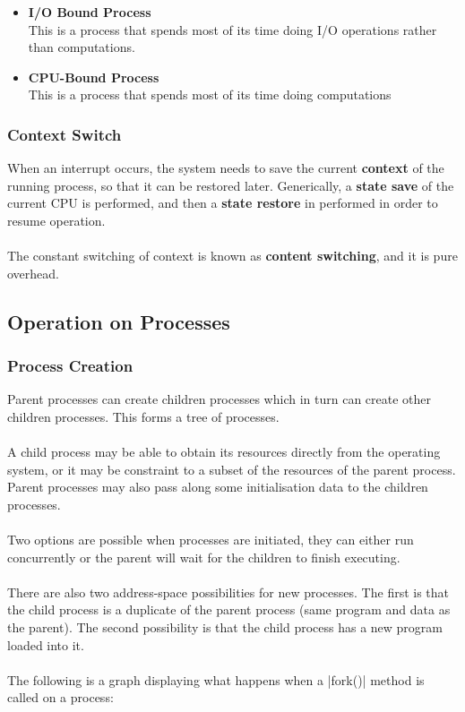 \documentclass{article}
\begin{document}
\begin{itemize}
	\item \textbf{I/O Bound Process}
	\vspace{.2cm} \\
	This is a process that spends most of its time doing I/O operations rather than computations.
	
	\item \textbf{CPU-Bound Process}
	\vspace{.2cm} \\
	This is a process that spends most of its time doing computations
\end{itemize}

\subsubsection{Context Switch}
When an interrupt occurs, the system needs to save the current \textbf{context} of the running process, so that it can be restored later. Generically, a \textbf{state save} of the current CPU is performed, and then a \textbf{state restore} in performed in order to resume operation. \\ \\
The constant switching of context is known as \textbf{content switching}, and it is pure overhead.

\subsection{Operation on Processes}

\subsubsection{Process Creation}
Parent processes can create children processes which in turn can create other children processes. This forms a tree of processes. \\ \\
A child process may be able to obtain its resources directly from the operating system, or it may be constraint to a subset of the resources of the parent process. Parent processes may also pass along some initialisation data to the children processes. \\ \\
Two options are possible when processes are initiated, they can either run concurrently or the parent will wait for the children to finish executing. \\ \\
There are also two address-space possibilities for new processes. The first is that the child process is a duplicate of the parent process (same program and data as the parent). The second possibility is that the child process has a new program loaded into it. \\ \\
The following is a graph displaying what happens when a \cverb|fork()| method is called on a process: \\ \\
\end{document}
